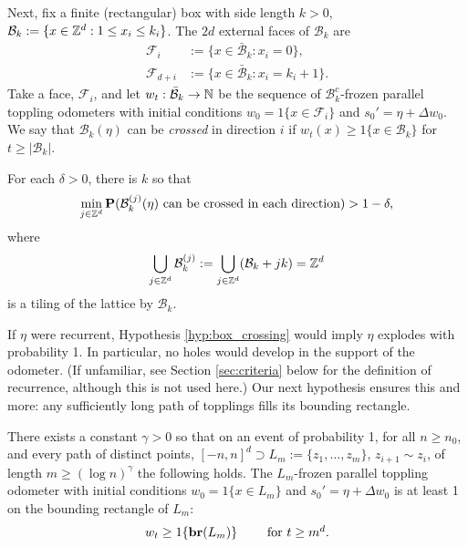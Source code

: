 \documentclass[12pt]{amsart}
\begin{document}
Next, fix a finite (rectangular) box with side length $k > 0$,  $\mathcal{B}_{k} := \{ x \in \mathbb{Z}^d : 1 \leq x_i \leq k_i \}$.
The $2 d$ external faces of $\mathcal{B}_k$ are 
\[
\begin{aligned}
\mathcal{F}_i &:= \{ x \in \bar{\mathcal{B}}_k : x_i = 0\}, \\
\mathcal{F}_{d+i} &:= \{x \in \bar{\mathcal{B}}_k : x_i = k_i+1\}.
\end{aligned}
\]
Take a face, $\mathcal{F}_i$, and let $w_t: \bar{\mathcal{B}}_k \to \mathbb{N}$ be the sequence of $\mathcal{B}_k^c$-frozen parallel toppling odometers with initial conditions  $w_0 = 1\{ x \in \mathcal{F}_i\}$ and $s_0' = \eta + \Delta w_0$. We say that $\mathcal{B}_k(\eta)$ can be {\it crossed} in direction $i$ if $w_{t}(x) \geq 1\{x \in \mathcal{B}_k \}$ for $t \geq |\mathcal{B}_k|$. 


\begin{hyp} \label{hyp:box_crossing}
	For each $\delta > 0$, there is $k$ so that 
	\[
	\min_{j \in \mathbb{Z}^d} \mathbf{P}(\mathcal{B}^{(j)}_k(\eta) \mbox{ can be crossed in each direction}) > 1 - \delta, 
	\]
	where 
	\[
	\bigcup_{j \in \mathbb{Z}^d} \mathcal{B}^{(j)}_{k} := \bigcup_{j \in \mathbb{Z}^d} (\mathcal{B}_k + j  k) = \mathbb{Z}^d
	\]
	is a tiling of the lattice by $\mathcal{B}_k$.
	
\end{hyp}
If $\eta$ were recurrent, Hypothesis \ref{hyp:box_crossing} would imply $\eta$ explodes with probability 1. In particular,  no holes would develop in the support of the odometer. (If unfamiliar, see Section \ref{sec:criteria}
below for the definition of recurrence, although this is not used here.) Our next hypothesis 
ensures this and more: any sufficiently long path of topplings fills its bounding rectangle.

\begin{hyp} \label{hyp:path_filling}
	There exists a constant $\gamma > 0$ so that on an event of probability 1, for all $n \geq n_0$, and every path of
	distinct points, $[-n,n]^d \supset L_m := \{z_1, \ldots, z_m\}$, $z_{i+1} \sim z_i$, of length $m \geq  (\log n)^{\gamma}$ the following holds. 
	The $L_m$-frozen parallel toppling odometer with initial conditions $w_0 = 1\{ x \in L_m\}$ and $s_0' = \eta + \Delta w_0$
	is at least 1 on the bounding rectangle of $L_m$:
	\[
	w_t \geq 1 \{ \mathbf{br}(L_m) \}  \qquad \mbox{ for $t \geq m^d$.}  
	\]
\end{hyp}
\end{document}

